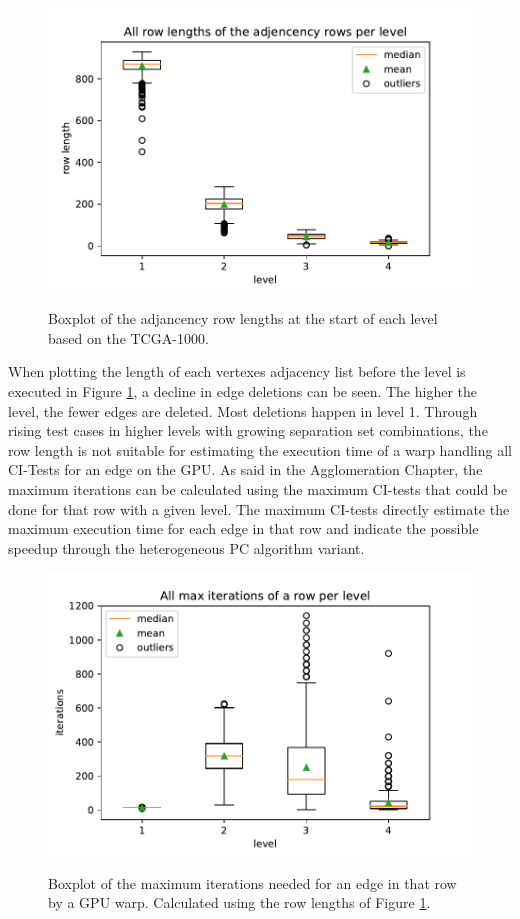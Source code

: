 \begin{figure}[H]
  \caption{Boxplot of the adjancency row lengths at the start of each level based on the TCGA-1000.}
  \includegraphics[width=\textwidth]{figures/rowlength_bxplt.pdf}
  \centering
  \label{fig:rowlength_bxplt}
\end{figure}

When plotting the length of each vertexes adjacency list before the level is executed in Figure \ref{fig:rowlength_bxplt}, a decline in edge deletions can be seen. The higher the level, the fewer edges are deleted. Most deletions happen in level 1. Through rising test cases in higher levels with growing separation set combinations, the row length is not suitable for estimating the execution time of a warp handling all CI-Tests for an edge on the GPU. As said in the Agglomeration Chapter, the maximum iterations can be calculated using the maximum CI-tests that could be done for that row with a given level. The maximum CI-tests directly estimate the maximum execution time for each edge in that row and indicate the possible speedup through the heterogeneous PC algorithm variant.

\begin{figure}[H]
  \caption{Boxplot of the maximum iterations needed for an edge in that row by a GPU warp. Calculated using the row lengths of Figure \ref{fig:rowlength_bxplt}.}
  \includegraphics[width=\textwidth]{figures/iterations_bxplt.pdf}
  \centering
  \label{fig:iterations_bxplt}
\end{figure}

